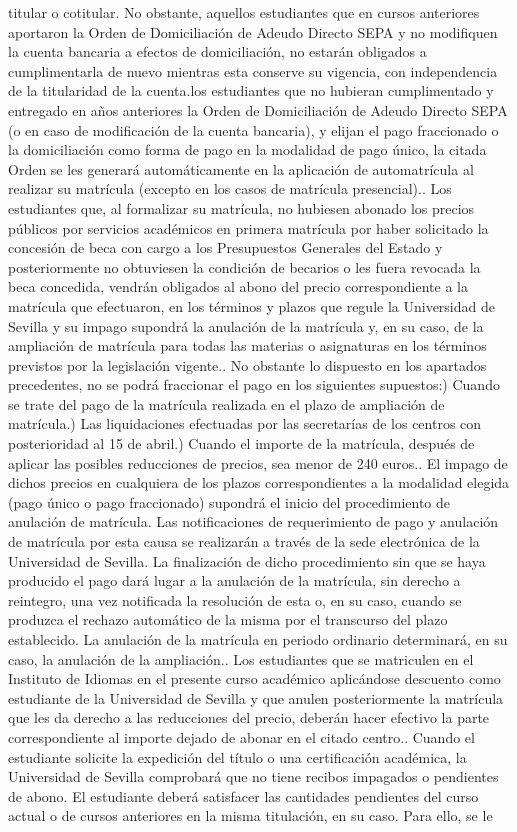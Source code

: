 \documentclass{article}
\begin{document}
\begin{itemize}
{titular o cotitular. No obstante, aquellos estudiantes que en cursos anteriores aportaron la Orden de Domiciliación de Adeudo Directo SEPA y no modifiquen la cuenta bancaria a efectos de domiciliación, no estarán obligados a cumplimentarla de nuevo mientras esta conserve su vigencia, con independencia de la titularidad de la cuenta.\n\nA los estudiantes que no hubieran cumplimentado y entregado en años anteriores la Orden de Domiciliación de Adeudo Directo SEPA (o en caso de modificación de la cuenta bancaria), y elijan el pago fraccionado o la domiciliación como forma de pago en la modalidad de pago único, la citada Orden se les generará automáticamente en la aplicación de automatrícula al realizar su matrícula (excepto en los casos de matrícula presencial).\n{}. Los estudiantes que, al formalizar su matrícula, no hubiesen abonado los precios públicos por servicios académicos en primera matrícula por haber solicitado la concesión de beca con cargo a los Presupuestos Generales del Estado y posteriormente no obtuviesen la condición de becarios o les fuera revocada la beca concedida, vendrán obligados al abono del precio correspondiente a la matrícula que efectuaron, en los términos y plazos que regule la Universidad de Sevilla y su impago supondrá la anulación de la matrícula y, en su caso, de la ampliación de matrícula para todas las materias o asignaturas en los términos previstos por la legislación vigente.\n{}. No obstante lo dispuesto en los apartados precedentes, no se podrá fraccionar el pago en los siguientes supuestos:\n\na) Cuando se trate del pago de la matrícula realizada en el plazo de ampliación de matrícula.\n\nb) Las liquidaciones efectuadas por las secretarías de los centros con posterioridad al 15 de abril.\n\nc) Cuando el importe de la matrícula, después de aplicar las posibles reducciones de precios, sea menor de 240 euros.\n{}. El impago de dichos precios en cualquiera de los plazos correspondientes a la modalidad elegida (pago único o pago fraccionado) supondrá el inicio del procedimiento de anulación de matrícula. Las notificaciones de requerimiento de pago y anulación de matrícula por esta causa se realizarán a través de la sede electrónica de la Universidad de Sevilla. La finalización de dicho procedimiento sin que se haya producido el pago dará lugar a la anulación de la matrícula, sin derecho a reintegro, una vez notificada la resolución de esta o, en su caso, cuando se produzca el rechazo automático de la misma por el transcurso del plazo establecido. La anulación de la matrícula en periodo ordinario determinará, en su caso, la anulación de la ampliación.\n{}. Los estudiantes que se matriculen en el Instituto de Idiomas en el presente curso académico aplicándose descuento como estudiante de la Universidad de Sevilla y que anulen posteriormente la matrícula que les da derecho a las reducciones del precio, deberán hacer efectivo la parte correspondiente al importe dejado de abonar en el citado centro.\n{}. Cuando el estudiante solicite la expedición del título o una certificación académica, la Universidad de Sevilla comprobará que no tiene recibos impagados o pendientes de abono. El estudiante deberá satisfacer las cantidades pendientes del curso actual o de cursos anteriores en la misma titulación, en su caso. Para ello, se le }
\end{itemize}
\end{document}
